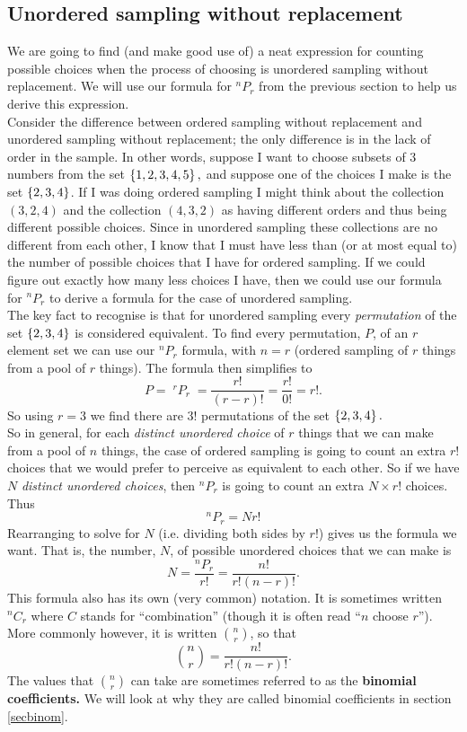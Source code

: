 \subsection{Unordered sampling without replacement} \label{sec313}
We are going to find (and make good use of) a neat expression for counting possible choices when the process of choosing is unordered sampling without replacement. We will use our formula for $^nP_r$ from the previous section to help us derive this expression. \\

\noindent Consider the difference between ordered sampling without replacement and unordered sampling without replacement; the only difference is in the lack of order in the sample. In other words, suppose I want to choose subsets of $3$ numbers from the set $\left\{1,2,3,4,5\right\},$ and suppose one of the choices I make is the set $\left\{2,3,4\right\}$. If I was doing ordered sampling I might think about the collection $(3,2,4)$ and the collection $(4,3,2)$ as having different orders and thus being different possible choices. Since in unordered sampling these collections are no different from each other, I know that I must have less than (or at most equal to) the number of possible choices that I have for ordered sampling. If we could figure out exactly how many less choices I have, then we could use our formula for $^nP_r$ to derive a formula for the case of unordered sampling. \\

\noindent The key fact to recognise is that for unordered sampling every \textit{permutation} of the set $\left\{2,3,4\right\}$ is considered equivalent. To find every permutation, $P$, of an $r$ element set we can use our $^nP_r$ formula, with $n = r$ (ordered sampling of $r$ things from a pool of $r$ things). The formula then simplifies to 
\[
P = \; ^rP_r \; = \frac{r!}{(r-r)!} = \frac{r!}{0!} = r!.
\]
So using $r = 3$ we find there are $3!$ permutations of the set $\left\{2,3,4\right\}.$ \\

\noindent So in general, for each \textit{distinct unordered choice} of $r$ things that we can make from a pool of $n$ things, the case of ordered sampling is going to count an extra $r!$ choices that we would prefer to perceive as equivalent to each other. So if we have $N$ \textit{distinct unordered choices}, then $^nP_r$ is going to count an extra $N \times r!$ choices. Thus
\[
^nP_r = Nr!
\]
Rearranging to solve for $N$ (i.e. dividing both sides by $r!$) gives us the formula we want. That is, the number, $N$, of possible unordered choices that we can make is
\[
N = \frac{^nP_r}{r!} = \frac{n!}{r!(n-r)!}.
\]
This formula also has its own (very common) notation. It is sometimes written $^nC_r$ where $C$ stands for ``combination'' (though it is often read ``$n$ choose $r$''). More commonly however, it is written $\binom{n}{r}$, so that
\[
\binom{n}{r} = \frac{n!}{r!(n-r)!}. \label{nCr}
\]
The values that $\binom{n}{r}$ can take are sometimes referred to as the \textbf{binomial coefficients.} We will look at why they are called binomial coefficients in section \ref{secbinom}.

